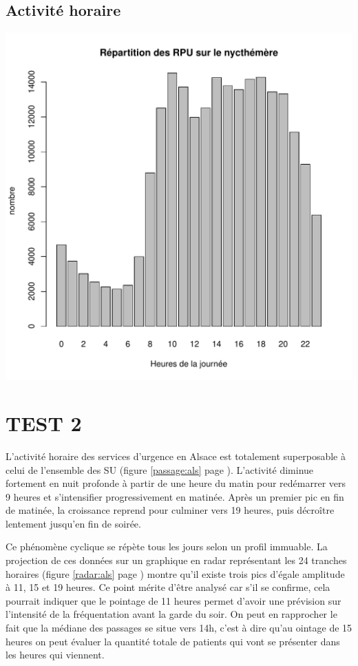 \documentclass[12pt,english,french,twoside]{report}\usepackage[]{graphicx}\usepackage[]{color}
\makeatletter
\def\maxwidth{ %
  \ifdim\Gin@nat@width>\linewidth
    \linewidth
  \else
    \Gin@nat@width
  \fi
}
\newenvironment{knitrout}{}{} %
\makeatother
\begin{document}
\subsection*{Activité horaire}
\begin{knitrout}
\color{fgcolor}
\includegraphics[width=\maxwidth]{figure/activite_heure} 

\end{knitrout}


  

\section{TEST 2}


L'activité horaire des services d'urgence en Alsace est totalement superposable à celui de l'ensemble des SU (figure \ref{passage:als} page \pageref{passage:als}). L'activité diminue fortement en nuit profonde à partir de une heure du matin pour redémarrer vers 9 heures et s'intensifier progressivement en matinée. Après un premier pic en fin de matinée, la croissance reprend pour culminer vers 19 heures, puis décroître lentement jusqu'en fin de soirée.

Ce phénomène cyclique se répète tous les jours selon un profil immuable. La projection de ces données sur un graphique en radar représentant les 24 tranches horaires (figure \ref{radar:als} page \pageref{radar:als}) montre qu'il existe trois pics d'égale amplitude à 11, 15 et 19 heures. Ce point mérite d'être analysé car s'il se confirme, cela pourrait indiquer que le pointage de 11 heures permet d'avoir une prévision sur l'intensité de la fréquentation avant la garde du soir. On peut en rapprocher le fait que la médiane des passages se situe vers 14h, c'est à dire qu'au ointage de 15 heures on peut évaluer la quantité totale de patients qui vont se présenter dans les heures qui viennent.
\end{document}
